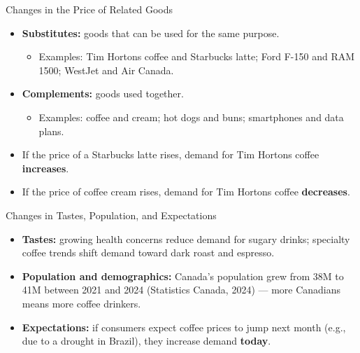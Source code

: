 \documentclass[aspectratio=169]{beamer}
\begin{document}
\begin{frame}{Changes in the Price of Related Goods}
\transfade
\begin{itemize}[<+->]
  \item \textbf{Substitutes:} goods that can be used for the same purpose.
  \begin{itemize}[<+->]
    \item Examples: Tim Hortons coffee and Starbucks latte; Ford F-150 and RAM 1500; WestJet and Air Canada.
  \end{itemize}
  \item \textbf{Complements:} goods used together.
  \begin{itemize}[<+->]
    \item Examples: coffee and cream; hot dogs and buns; smartphones and data plans.
  \end{itemize}
  \item If the price of a Starbucks latte rises, demand for Tim Hortons coffee \textbf{increases}.
  \item If the price of coffee cream rises, demand for Tim Hortons coffee \textbf{decreases}.
\end{itemize}
\end{frame}

\begin{frame}{Changes in Tastes, Population, and Expectations}
\transfade
\begin{itemize}[<+->]
  \item \textbf{Tastes:} growing health concerns reduce demand for sugary drinks; specialty coffee trends shift demand toward dark roast and espresso.
  \item \textbf{Population and demographics:} Canada's population grew from 38M to 41M between 2021 and 2024 (Statistics Canada, 2024) --- more Canadians means more coffee drinkers.
  \item \textbf{Expectations:} if consumers expect coffee prices to jump next month (e.g., due to a drought in Brazil), they increase demand \textbf{today}.
\end{itemize}
\end{frame}
\end{document}
